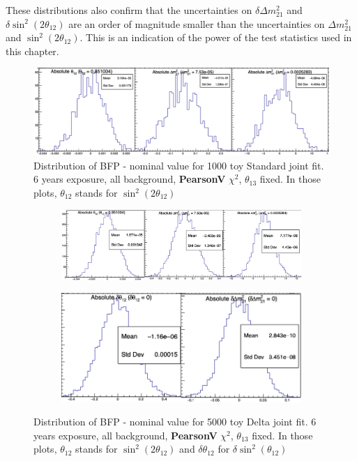 \documentclass[../main.tex]{subfiles}
\begin{document}
These distributions also confirm that the uncertainties on $\delta \Delta m^2_{21}$ and $\delta \sin^2(2 \theta_{12})$ are an order of magnitude smaller than the uncertainties on $\Delta m^2_{21}$ and $\sin^2(2\theta_{12})$. This is an indication of the power of the test statistics used in this chapter.

\begin{figure}[ht]
  \centering
  \includegraphics[width=\linewidth]{images/joint_fit/absolute_standard_joint_pearsonV.png}
  \caption{Distribution of BFP - nominal value for 1000 toy Standard joint fit. 6 years exposure, all background, \textbf{PearsonV} $\chi^2$, $\theta_{13}$ fixed. In those plots, $\theta_{12}$ stands for $\sin^2(2\theta_{12})$}
  \label{fig:joint_fit:abs_standard_pearsonV}
\end{figure}

\begin{figure}[ht]
  \centering
  \begin{subfigure}[t]{0.98\linewidth}
    \centering
    \includegraphics[width=\linewidth]{images/joint_fit/normal_delta_joint.png}
  \end{subfigure}

  \begin{subfigure}[t]{0.66\linewidth}
    \centering
    \includegraphics[width=\linewidth]{images/joint_fit/supp_delta_joint.png}
  \end{subfigure}

  \caption{Distribution of BFP - nominal value for 5000 toy Delta joint fit. 6 years exposure, all background, \textbf{PearsonV} $\chi^2$, $\theta_{13}$ fixed. In those plots, $\theta_{12}$ stands for $\sin^2(2\theta_{12})$ and $\delta \theta_{12}$ for $\delta \sin^2(\theta_{12})$}
  \label{fig:joint_fit:delta_fit}
\end{figure}
\end{document}
